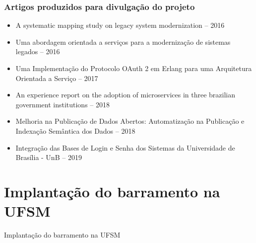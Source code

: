 \documentclass{beamer}
\begin{document}
\begin{frame}
\frametitle{Artigos produzidos para divulgação do projeto}

\small{
	\begin{itemize}
		\item<1->A systematic mapping study on legacy system modernization -- 2016
		\item<1->Uma abordagem orientada a serviços para a modernização de sistemas legados -- 2016
		\item<1->Uma Implementação do Protocolo OAuth 2 em Erlang para uma Arquitetura Orientada a Serviço -- 2017
		\item<1->An experience report on the adoption of microservices in three brazilian government institutions -- 2018
		\item<1->Melhoria na Publicação de Dados Abertos: Automatização na Publicação e Indexação Semântica dos Dados -- 2018
		\item<1->Integração das Bases de Login e Senha dos Sistemas da Universidade de Brasília - UnB -- 2019
	\end{itemize}
}

\end{frame}










\section{Implantação do barramento na UFSM}


\begin{frame}[c]{ }
\centering
\huge{Implantação do barramento na UFSM}
\end{frame}
\end{document}
